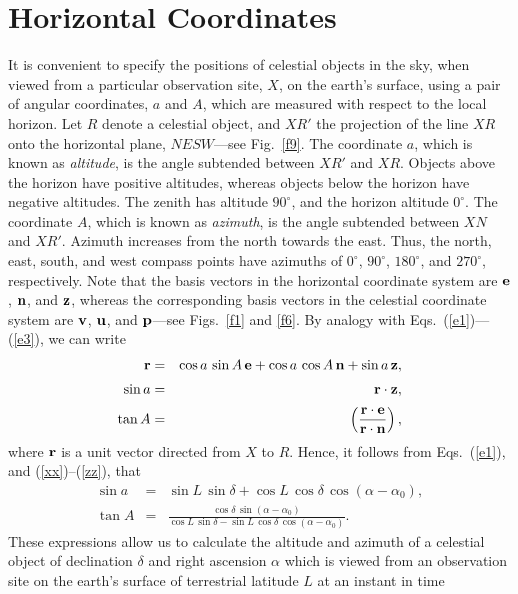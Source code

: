 \section{Horizontal Coordinates}
It is convenient to specify the positions of celestial objects  in the sky, when viewed from
a particular observation site, $X$, on the earth's surface, using a pair of angular coordinates, $a$ and $A$,
which are measured with respect to the local horizon. Let $R$ denote
a celestial object, and $XR'$ the projection of the line $XR$ onto the
horizontal plane, $NESW$---see Fig.~\ref{f9}. The coordinate $a$, which
is known as {\em altitude}, is the angle subtended between $XR'$ and
$XR$. Objects above the horizon have positive altitudes, whereas
objects below the horizon have negative altitudes. The
zenith has altitude $90^\circ$, and the horizon altitude $0^\circ$. The coordinate $A$,
which is known as {\em azimuth}, is the angle subtended between 
$XN$ and $XR'$. Azimuth increases from the north towards the east. Thus, the
north, east, south, and west compass points have azimuths of
$0^\circ$, $90^\circ$, $180^\circ$, and $270^\circ$, respectively. 
Note that the basis vectors in the horizontal coordinate system are ${\bf e}$,
${\bf n}$, and ${\bf z}$, whereas the corresponding basis vectors in the
celestial coordinate system are ${\bf v}$, ${\bf u}$, and ${\bf p}$---see Figs.~\ref{f1} and \ref{f6}. By analogy with Eqs.~(\ref{e1})---(\ref{e3}), we can write
\begin{eqnarray}\label{e27}
{\bf r} &=& \cos a\,\sin A\,{\bf e} + \cos a\,\cos A\,{\bf n}  + \sin a\,{\bf z},\\[0.5ex]
\sin a &=& {\bf r}\cdot {\bf z},\\[0.5ex]
\tan A &=& \left(\frac{{\bf r}\cdot {\bf e}}{{\bf r}\cdot {\bf n}}\right),
\end{eqnarray}
where ${\bf r}$ is a unit vector directed from $X$ to $R$.
Hence, it follows from Eqs.~(\ref{e1}), and (\ref{xx})--(\ref{zz}), that
\begin{eqnarray}\label{e30}
\sin a &=& \sin L\,\sin \delta + \cos L\,\cos \delta\,\cos(\alpha-\alpha_0),\\[0.5ex]
\tan A &=& \frac{\cos \delta\,\sin (\alpha-\alpha_0)}{\cos L\,\sin \delta - \sin L\,\cos\delta\,\cos(\alpha - \alpha_0)}.\label{e31}
\end{eqnarray}
These expressions allow us to calculate the altitude and azimuth of a
celestial object of declination $\delta$ and right ascension $\alpha$
which is viewed from an observation  site on the earth's surface of terrestrial latitude $L$ at an instant in time
